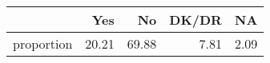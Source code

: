 \begin{table}[ht]
\centering
\begin{tabular}{rrrrr}
  \hline
 & Yes & No & DK/DR & NA \\ 
  \hline
proportion & 20.21 & 69.88 & 7.81 & 2.09 \\ 
   \hline
\end{tabular}
\end{table}
